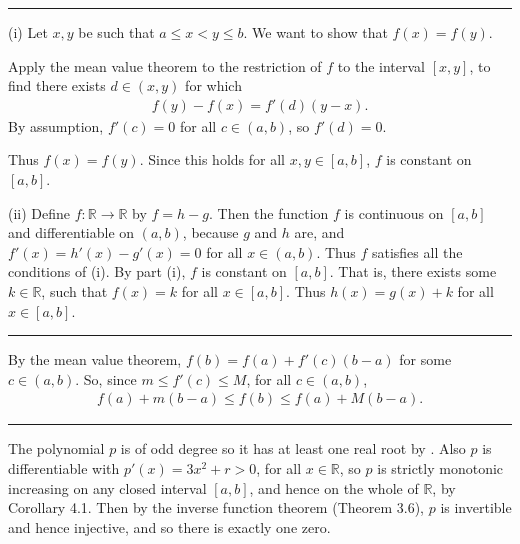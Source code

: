 \documentclass[letterpaper,10pt,english]{jupyterBook}
\begin{document}
\bigskip\hrule\bigskip


\sphinxAtStartPar
{\hyperref[\detokenize{Problems:id49}]{}}
(i) Let \(x, y\) be such that \(a \leq x < y \leq b\). We want to show that \(f(x)=f(y)\).

\sphinxAtStartPar
Apply the mean value theorem to the restriction of \(f\) to the interval \([x, y]\), to find there exists \(d \in (x, y)\) for which
\begin{equation*}
\begin{split}
f(y) - f(x) = f'(d)(y-x).
\end{split}
\end{equation*}
\sphinxAtStartPar
By assumption, \(f'(c)=0\) for all \(c\in(a,b)\), so \(f'(d)=0\).

\sphinxAtStartPar
Thus \(f(x)=f(y)\). Since this holds for all \(x,y\in [a,b]\), \(f\) is constant on \([a,b]\).

\sphinxAtStartPar
(ii) Define \(f:\mathbb{R}\to\mathbb{R}\) by \(f = h-g\). Then the function \(f\) is continuous on \([a,b]\) and differentiable on \((a,b)\), because \(g\) and \(h\) are, and \(f'(x)=h'(x)-g'(x)=0\) for all \(x\in (a,b)\). Thus \(f\) satisfies all the conditions of (i). By part (i), \(f\) is constant on \([a,b]\). That is, there exists some \(k\in \mathbb{R}\), such that \(f(x)=k\) for all \(x\in [a,b]\). Thus \(h(x)=g(x)+k\) for all \(x\in [a,b]\).


\bigskip\hrule\bigskip


\sphinxAtStartPar
{\hyperref[\detokenize{Problems:id50}]{}} By the mean value theorem, \(f(b) = f(a) + f'(c)(b - a)\) for some \(c\in (a,b)\). So, since \(m \leq f'(c) \leq M\), for all \(c \in (a, b)\),
\begin{equation*}
\begin{split}
f(a) + m(b - a) \leq f(b) \leq f(a) + M(b - a).
\end{split}
\end{equation*}

\bigskip\hrule\bigskip


\sphinxAtStartPar
{\hyperref[\detokenize{Problems:id51}]{}} The polynomial \(p\) is of odd degree so it has at least one real root by . Also \(p\) is differentiable with \(p'(x) = 3x^{2} + r > 0\), for all \(x \in \mathbb{R}\), so \(p\) is strictly monotonic increasing on any closed interval \([a, b]\), and hence on the whole of \(\mathbb{R}\), by Corollary 4.1. Then by the inverse function theorem (Theorem 3.6), \(p\) is invertible and hence injective, and so there is exactly one zero.
\end{document}
